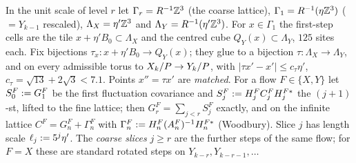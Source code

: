 \begin{definition}\label{rot:def:match}
In the unit scale of level $r$ let $\Gamma_r=R^{-1}\mathbb Z^3$ (the coarse lattice), $\Gamma_1=R^{-1}(\eta\mathbb Z^3)$ ($=Y_{k-1}$ rescaled), $\Lambda_X=\eta'\mathbb Z^3$ and $\Lambda_Y=R^{-1}(\eta'\mathbb Z^3)$. For $x\in\Gamma_1$ the first-step cells are the tile $x+\eta'B_0\subset\Lambda_X$ and the centred cube $Q_Y(x)\subset\Lambda_Y$, $125$ sites each. Fix bijections $\tau_x:x+\eta'B_0\to Q_Y(x)$; they glue to a bijection $\tau:\Lambda_X\to\Lambda_Y$, and on every admissible torus to $X_k/P\to Y_k/P$, with $|\tau x'-x'|\le c_\tau\eta'$, $c_\tau=\sqrt{13}+2\sqrt3<7.1$. Points $x''=\tau x'$ are \emph{matched}. For a flow $F\in\{X,Y\}$ let $S^F_0:= G^F_1$ be the first fluctuation covariance and $S^F_j:= H^F_jC^F_jH^{F*}_j$ the $(j+1)$-st, lifted to the fine lattice; then $G^F_r=\sum_{j<r}S^F_j$ exactly, and on the infinite lattice $C^F=G^F_n+\Gamma^F_n$ with $\Gamma^F_n:= H^F_n(A^F_n)^{-1}H^{F*}_n$ (Woodbury). Slice $j$ has length scale $\ell_j:=5^j\eta'$. The \emph{coarse slices} $j\ge r$ are the further steps of the same flow; for $F=X$ these are standard rotated steps on $Y_{k-r},Y_{k-r-1},\dots$
\end{definition}

